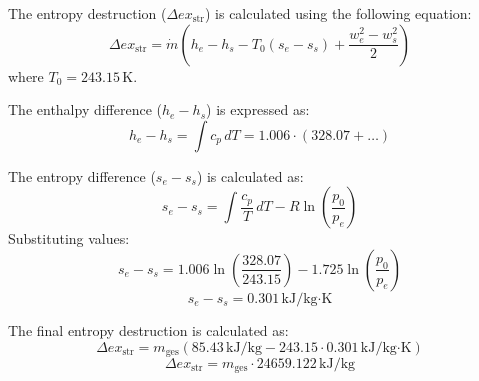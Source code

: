 The entropy destruction (\( \Delta ex_{\text{str}} \)) is calculated using the following equation:  
\[
\Delta ex_{\text{str}} = \dot{m}(h_e - h_s - T_0(s_e - s_s) + \frac{w_e^2 - w_s^2}{2})
\]  
where \( T_0 = 243.15 \, \text{K} \).  

The enthalpy difference (\( h_e - h_s \)) is expressed as:  
\[
h_e - h_s = \int c_p \, dT = 1.006 \cdot (328.07 + \dots)  
\]  

The entropy difference (\( s_e - s_s \)) is calculated as:  
\[
s_e - s_s = \int \frac{c_p}{T} \, dT - R \ln \left( \frac{p_0}{p_e} \right)  
\]  
Substituting values:  
\[
s_e - s_s = 1.006 \ln \left( \frac{328.07}{243.15} \right) - 1.725 \ln \left( \frac{p_0}{p_e} \right)  
\]  
\[
s_e - s_s = 0.301 \, \text{kJ/kg·K}  
\]  

The final entropy destruction is calculated as:  
\[
\Delta ex_{\text{str}} = m_{\text{ges}} \left( 85.43 \, \text{kJ/kg} - 243.15 \cdot 0.301 \, \text{kJ/kg·K} \right)  
\]  
\[
\Delta ex_{\text{str}} = m_{\text{ges}} \cdot 24659.122 \, \text{kJ/kg}  
\]